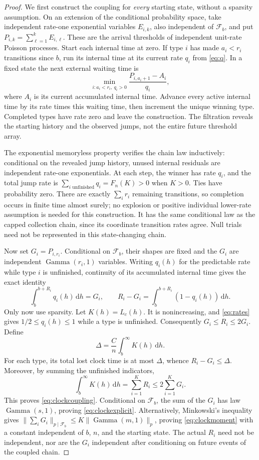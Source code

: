 \documentclass[11pt]{article}
\theoremstyle{remark}\newtheorem{remark}[theorem]{Remark}
\newcommand{\Fcal}{\mathcal F}
\newcommand{\dd}{\,\mathrm d}
\newcommand{\norm}[1]{\lVert #1\rVert}
\begin{document}
\begin{proof}
We first construct the coupling for \emph{every} starting state, without a
sparsity assumption. On an extension of the conditional probability space,
take independent rate-one exponential variables $E_{i,k}$, also independent
of $\Fcal_b$, and put $P_{i,k}=\sum_{\ell=1}^k E_{i,\ell}$. These are the
arrival thresholds of independent unit-rate Poisson processes.
Start each internal time at zero. If type $i$ has made $a_i<r_i$ transitions
since $b$, run its internal time at its current rate $q_i$ from \eqref{eq:q}.
In a fixed state the next external waiting time is
\[
 \min_{i:a_i<r_i,\ q_i>0}
       \frac{P_{i,a_i+1}-A_i}{q_i},
\]
where $A_i$ is its current accumulated internal time. Advance every active
internal time by its rate times this waiting time, then increment the unique
winning type. Completed types have rate zero and leave the construction.
The filtration reveals the starting history and the observed jumps, not
the entire future threshold array.

The exponential memoryless property verifies the chain law inductively:
conditional on the revealed jump history, unused internal residuals are
independent rate-one exponentials. At each step, the winner has rate $q_i$,
and the total jump rate is
$\sum_{i\text{ unfinished}}q_i=F_n(K)>0$ when $K>0$.
Ties have probability zero. There are exactly $\sum_i r_i$ remaining
transitions, so completion occurs in finite time almost surely; no explosion
or positive individual lower-rate assumption is needed for this construction.
It has the same conditional law as the capped collection chain, since its
coordinate transition rates agree. Null trials need not be represented in
this state-changing chain.

Now set $G_i=P_{i,r_i}$. Conditional on $\Fcal_b$, their shapes are fixed
and the $G_i$ are independent $\operatorname{Gamma}(r_i,1)$ variables.
Writing $q_i(h)$ for the predictable rate while type $i$ is unfinished,
continuity of its accumulated internal time gives the exact identity
\[
 \int_b^{b+R_i}q_i(h)\dd h=G_i,\qquad
 R_i-G_i=\int_b^{b+R_i}(1-q_i(h))\dd h.
\]
Only now use sparsity. Let $K(h)=L_c(h)$. It is nonincreasing, and
\eqref{eq:rates} gives
$1/2\le q_i(h)\le1$ while a type is unfinished. Consequently
$G_i\le R_i\le2G_i$. Define
\[
 \Delta=\frac Cn\int_b^\infty K(h)\dd h.
\]
For each type, its total lost clock time is at most $\Delta$, whence
$R_i-G_i\le\Delta$. Moreover, by summing the unfinished indicators,
\[
 \int_b^\infty K(h)\dd h=\sum_{i=1}^K R_i
 \le2\sum_{i=1}^K G_i.
\]
This proves \eqref{eq:clockcoupling}. Conditional on $\Fcal_b$, the sum of
the $G_i$ has law $\operatorname{Gamma}(s,1)$, proving
\eqref{eq:clockexplicit}. Alternatively, Minkowski's inequality gives
$\norm{\sum_i G_i}_{p\mid\Fcal_b}
 \le K\norm{\operatorname{Gamma}(m,1)}_p$, proving \eqref{eq:clockmoment}
with a constant independent of $b$, $n$, and the starting state.
The actual $R_i$ need not be independent, nor are the $G_i$ independent
after conditioning on future events of the coupled chain.
\end{proof}
\end{document}
